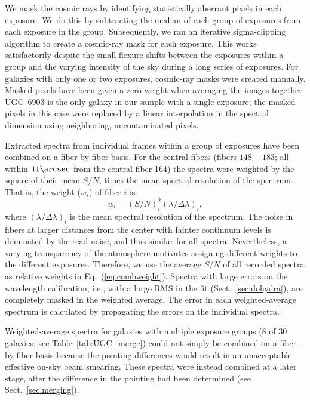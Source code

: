 \documentclass[traditabstract]{aa} %
\begin{document}
We mask the cosmic rays by identifying statistically aberrant pixels in each
exposure.  We do this by subtracting the median of each group of exposures from
each exposure in the group.  Subsequently, we ran an iterative sigma-clipping
algorithm to create a cosmic-ray mask for each exposure.  This works
satisfactorily despite the small flexure shifts between the exposures within a
group and the varying intensity of the sky during a long series of exposures.
For galaxies with only one or two exposures, cosmic-ray masks were created
manually.  Masked pixels have been given a zero weight when averaging the images
together.  UGC~6903 is the only galaxy in our sample with a single exposure; the
masked pixels in this case were replaced by a linear interpolation in the
spectral dimension using neighboring, uncontaminated pixels.

Extracted spectra from individual frames within a group of exposures have been
combined on a fiber-by-fiber basis.  For the central fibers (fibers $148-183$;
all within $11\arcsec$ from the central fiber 164) the spectra were weighted by
the square of their mean $S/N$, times the mean spectral resolution of the
spectrum.  That is, the weight ($w_i$) of fiber $i$ is
%
\begin{equation}
%
w_i = (S/N)_i^2 (\lambda/\Delta\lambda)_i ,
%
\label{eq:combweight}
%
\end{equation}
%
where $(\lambda/\Delta\lambda)_i$ is the mean spectral resolution of the
spectrum.  The noise in fibers at larger distances from the center with fainter
continuum levels is dominated by the read-noise, and thus similar for all
spectra. Nevertheless, a varying transparency of the atmosphere motivates
assigning different weights to the different exposures.  Therefore, we use the
average $S/N$ of all recorded spectra as relative weights in
Eq.~(\ref{eq:combweight}).  Spectra with large errors on the wavelength
calibration, i.e., with a large RMS in the fit (Sect.~\ref{sec:dohydra}), are
completely masked in the weighted average. The error in each weighted-average
spectrum is calculated by propagating the errors on the individual spectra.

Weighted-average spectra for galaxies with multiple exposure groups (8 of 30
galaxies; see Table~\ref{tab:UGC_merge}) could not simply be combined on a
fiber-by-fiber basis because the pointing differences would result in an
unacceptable effective on-sky beam smearing.  These spectra were instead
combined at a later stage, after the difference in the pointing had been
determined (see Sect.~\ref{sec:merging}).
\end{document}

